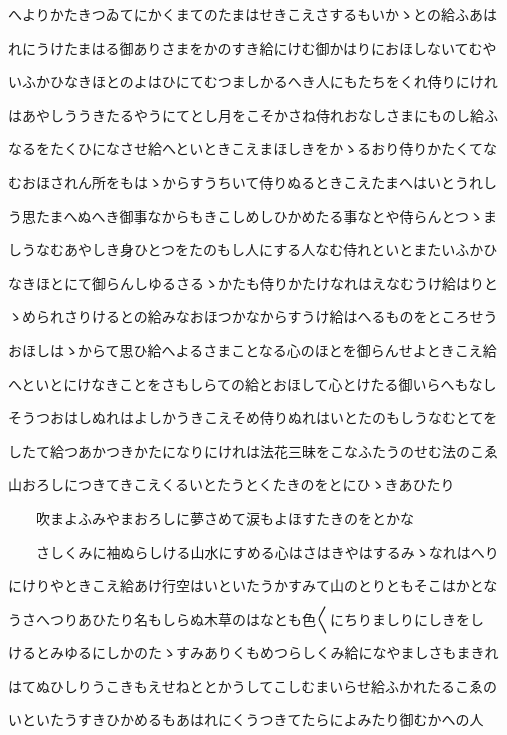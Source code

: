 \documentclass[a4paper,11pt,landscape]{ltjtarticle}
\begin{document}
へよりかたきつゐてにかくまてのたまはせきこえさするもいかゝとの給ふあは
\par\medskip
れにうけたまはる御ありさまをかのすき給にけむ御かはりにおほしないてむや
\par\medskip
いふかひなきほとのよはひにてむつましかるへき人にもたちをくれ侍りにけれ
\par\medskip
はあやしううきたるやうにてとし月をこそかさね侍れおなしさまにものし給ふ
\par\medskip
なるをたくひになさせ給へといときこえまほしきをかゝるおり侍りかたくてな
\par\medskip
むおほされん所をもはゝからすうちいて侍りぬるときこえたまへはいとうれし
\par\medskip
う思たまへぬへき御事なからもきこしめしひかめたる事なとや侍らんとつゝま
\par\medskip
しうなむあやしき身ひとつをたのもし人にする人なむ侍れといとまたいふかひ
\par\medskip
なきほとにて御らんしゆるさるゝかたも侍りかたけなれはえなむうけ給はりと
\par\medskip
ゝめられさりけるとの給みなおほつかなからすうけ給はへるものをところせう
\par\medskip
おほしはゝからて思ひ給へよるさまことなる心のほとを御らんせよときこえ給
\par\medskip
へといとにけなきことをさもしらての給とおほして心とけたる御いらへもなし
\par\medskip
そうつおはしぬれはよしかうきこえそめ侍りぬれはいとたのもしうなむとてを
\par\medskip
したて給つあかつきかたになりにけれは法花三昧をこなふたうのせむ法のこゑ
\par\medskip
山おろしにつきてきこえくるいとたうとくたきのをとにひゝきあひたり
\par\medskip
　　吹まよふみやまおろしに夢さめて涙もよほすたきのをとかな
\par\medskip
　　さしくみに袖ぬらしける山水にすめる心はさはきやはするみゝなれはへり
\par\medskip
にけりやときこえ給あけ行空はいといたうかすみて山のとりともそこはかとな
\par\medskip
うさへつりあひたり名もしらぬ木草のはなとも色〱にちりましりにしきをし
\par\medskip
けるとみゆるにしかのたゝすみありくもめつらしくみ給になやましさもまきれ
\par\medskip
はてぬひしりうこきもえせねととかうしてこしむまいらせ給ふかれたるこゑの
\par\medskip
いといたうすきひかめるもあはれにくうつきてたらによみたり御むかへの人
\end{document}
